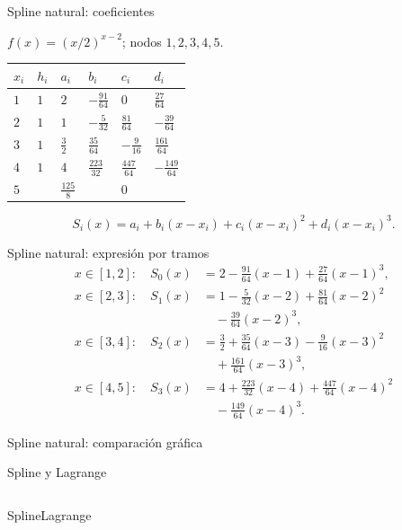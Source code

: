\documentclass[main.tex]{subfiles}
\begin{document}
\begin{frame}[t]{Spline natural: coeficientes}
\par\noindent\begin{minipage}[t][9mm][t]{\textwidth}\small\strut $f(x)=(x/2)^{x-2}$; nodos $1,2,3,4,5$.\end{minipage}\par\nointerlineskip
\begin{minipage}[t]{\textwidth}\begingroup\scriptsize\setlength{\tabcolsep}{2pt}\begin{center}\begin{tabular}{|C{.12\textwidth}|C{.12\textwidth}|C{.12\textwidth}|C{.12\textwidth}|C{.12\textwidth}|C{.12\textwidth}|}\hline
\rule[-2mm]{0pt}{6mm}$x_i$&$h_i$&$a_i$&$b_i$&$c_i$&$d_i$\\\hline
\rule[-2.5mm]{0pt}{8mm}$1$&$1$&$2$&$-\frac{91}{64}$&$0$&$\frac{27}{64}$\\\hline
\rule[-2.5mm]{0pt}{8mm}$2$&$1$&$1$&$-\frac{5}{32}$&$\frac{81}{64}$&$-\frac{39}{64}$\\\hline
\rule[-2.5mm]{0pt}{8mm}$3$&$1$&$\frac{3}{2}$&$\frac{35}{64}$&$-\frac{9}{16}$&$\frac{161}{64}$\\\hline
\rule[-2.5mm]{0pt}{8mm}$4$&$1$&$4$&$\frac{223}{32}$&$\frac{447}{64}$&$-\frac{149}{64}$\\\hline
\rule[-2.5mm]{0pt}{8mm}$5$&&$\frac{125}{8}$&&$0$&\\\hline
\end{tabular}\end{center}\endgroup\end{minipage}\par
\[S_i(x)=a_i+b_i(x-x_i)+c_i(x-x_i)^2+d_i(x-x_i)^3.\]
\end{frame}
\begin{frame}[t]{Spline natural: expresión por tramos}
\small
\begin{align*}
x\in[1,2]:\quad S_0(x)&=2-\tfrac{91}{64}(x-1)+\tfrac{27}{64}(x-1)^3,\\[3mm]
x\in[2,3]:\quad S_1(x)&=1-\tfrac5{32}(x-2)+\tfrac{81}{64}(x-2)^2\\
&\quad-\tfrac{39}{64}(x-2)^3,\\[3mm]
x\in[3,4]:\quad S_2(x)&=\tfrac32+\tfrac{35}{64}(x-3)-\tfrac9{16}(x-3)^2\\
&\quad+\tfrac{161}{64}(x-3)^3,\\[3mm]
x\in[4,5]:\quad S_3(x)&=4+\tfrac{223}{32}(x-4)+\tfrac{447}{64}(x-4)^2\\
&\quad-\tfrac{149}{64}(x-4)^3.
\end{align*}
\end{frame}
\begin{frame}[t]{Spline natural: comparación gráfica}
\end{frame}
\begin{frame}[t]{Spline y Lagrange}
\begin{columns}\centering Spline\centering Lagrange\end{columns}
\end{frame}
\end{document}
